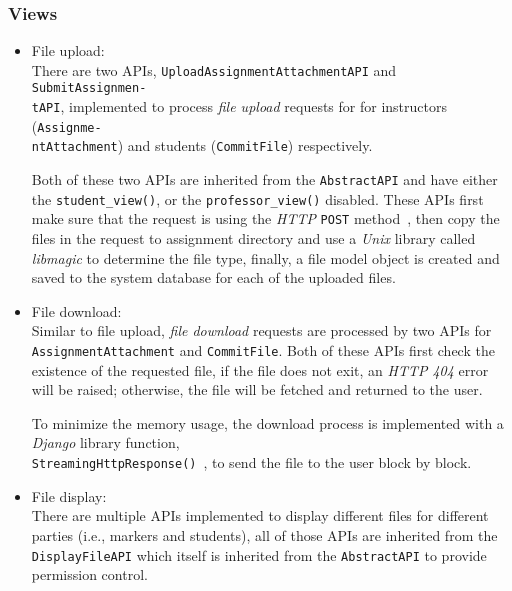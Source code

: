 \subsubsection{Views}
\begin{itemize}
    \item File upload: \\
    There are two APIs, 
    \texttt{UploadAssignmentAttachmentAPI} and
    \texttt{SubmitAssignmen-\\tAPI}, 
    implemented to process \emph{file upload} requests for
    for instructors (\texttt{Assignme-\\ntAttachment}) and students
    (\texttt{CommitFile}) respectively.

    Both of these two APIs are inherited from the 
    \texttt{AbstractAPI} and have either the \texttt{student\_view()},
    or the \texttt{professor\_view()} disabled.
    These APIs first make sure that the request is using the
    \emph{HTTP} \texttt{POST} method~\citep[Section 4.3.3]{http},
    then copy the files in the request to assignment directory and use 
    a \emph{Unix} library called \emph{libmagic} \cite{libmagic} to determine
    the file type,
    finally, a file model object is created and saved to the system database
    for each of the uploaded files.

    \item File download: \\
    Similar to file upload, \emph{file download} requests are processed by
    two APIs for \texttt{AssignmentAttachment} and \texttt{CommitFile}. Both
    of these APIs first check the existence of the requested file, if the file
    does not exit, an \emph{HTTP 404} error~\citep[Section 6.5.4]{http} will be
    raised; otherwise, the
    file will be fetched and returned to the user.

    To minimize the memory usage, the download process is implemented with
    a \emph{Django} library function, \\
    \texttt{StreamingHttpResponse()}~\citep[Section StreamingHttpResponse objects]{djangoRequest},
    to send the file to the user block by block.

    \item File display: \\
    There are multiple APIs implemented to display different files for different
    parties
    (i.e., markers and students), all of those APIs are inherited from the
    \texttt{DisplayFileAPI} which itself is inherited from the
    \texttt{AbstractAPI} to provide permission control.


\end{itemize}
